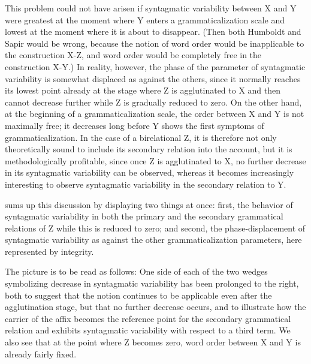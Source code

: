 This problem could not have arisen if syntagmatic variability between X and Y were greatest at the moment where Y enters a grammaticalization scale and lowest at the moment where it is about to disappear. (Then both Humboldt and Sapir would be wrong, because the notion of word order would be inapplicable to the construction X-Z, and word order would be completely free in the construction X-Y.) In reality, however, the phase of the parameter of syntagmatic variability is somewhat displaced as against the others, since it normally reaches its lowest point already at the stage where Z is agglutinated to X and then cannot decrease further while Z is gradually reduced to zero. On the other hand, at the beginning of a grammaticalization scale, the order between X and Y is not maximally free; it decreases long before Y shows the first symptoms of grammaticalization. In the case of a birelational Z, it is therefore not only theoretically sound to include its secondary relation into the account, but it is methodologically profitable, since once Z is agglutinated to X, no further decrease in its syntagmatic variability can be observed, whereas it becomes increasingly interesting to observe syntagmatic variability in the secondary relation to Y.

 sums up this discussion by displaying two things at once: first, the behavior of syntagmatic variability in both the primary and the secondary grammatical relations of Z while this is reduced to zero; and second, the phase-displacement of syntagmatic variability as against the other grammaticalization parameters, here represented by integrity.

The picture is to be read as follows: One side of each of the two wedges symbolizing decrease in syntagmatic variability has been prolonged to the right, both to suggest that the notion continues to be applicable even after the agglutination stage, but that no further decrease occurs, and to illustrate how the carrier of the affix becomes the reference point for the secondary grammatical relation and exhibits syntagmatic variability with respect to a third term. We also see that at the point where Z becomes zero, word order between X and Y is already fairly fixed.

